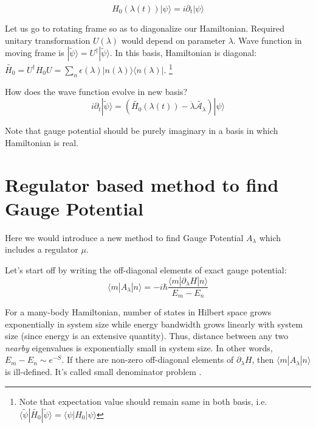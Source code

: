 \documentclass[11pt,a4paper]{article}
\begin{document}
\begin{equation}
H_0(\lambda (t)) |\psi \rangle= i \partial_t|\psi \rangle
\end{equation}

Let us go to rotating frame so as to diagonalize our Hamiltonian. Required unitary transformation $U(\lambda)$ would depend on parameter $\lambda$. Wave function in moving frame is $|\tilde{\psi}  \rangle = U^{\dagger} |\tilde{\psi}  \rangle$. In this basis, Hamiltonian is diagonal:
$\tilde{H_0}= U^{\dagger} H_0 U = \sum_n \epsilon (\lambda)  |n (\lambda)\rangle \langle  n (\lambda) |$. \footnote{Note that expectation value should remain same in both basis, i.e.$ \langle \tilde{\psi} | \tilde{H_0}  |\tilde{\psi}  \rangle= \langle{\psi} | {H_0}  |{\psi}  \rangle$}

How does the wave function evolve in new basis?
\begin{equation}
 i \partial_t|\tilde{\psi} \rangle=(\tilde{H_0
 }(\lambda (t)) - \dot{\lambda} \tilde{\mathcal{A_\lambda}}) |\psi \rangle
\end{equation}

Note that gauge potential should be purely imaginary in a basis in which Hamiltonian is real. 




\section{ Regulator based method to find Gauge Potential}
Here we would introduce a new method to find Gauge Potential $A_{\lambda}$ which includes a regulator $\mu$. 

Let's start off by writing the off-diagonal elements of exact gauge potential:
\begin{equation}
\langle m |A_{\lambda} | n \rangle =-i \hbar \dfrac{\langle m |\partial_{\lambda}H | n \rangle}{E_m-E_n}
\end{equation}

For a many-body Hamiltonian, number of states in Hilbert space grows exponentially in system size while energy bandwidth grows linearly with system size (since energy is an extensive quantity). Thus, distance between any two \textit{nearby} eigenvalues is exponentially small in system size. In other words, $E_m-E_n \sim e^{-S}$. If there are non-zero off-diagonal elements of $\partial_{\lambda}H $, then $\langle m |A_{\lambda} | n \rangle$ is ill-defined. It's called small denominator problem \cite{kolodrubetz2016geometry}.
\end{document}
